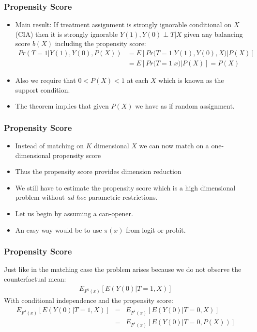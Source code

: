 \documentclass[xcolor=pdftex,dvipsnames,table,mathserif,aspectratio=169]{beamer}
\begin{document}
\begin{frame}
\frametitle{Propensity Score}
\begin{itemize}
\item Main result: If treatment assignment is strongly ignorable conditional on $X$ (CIA) then it is strongly ignorable $Y(1),Y(0) \perp T | X$ given any balancing score $b(X)$ including the propensity score:
\begin{align*}
Pr(T=1 | Y(1), Y(0),P(X))&= E[Pr(T=1| Y(1),Y(0),X) | P(X)] \\
&= E[Pr(T=1 | x) | P(X) ] = P(X)
\end{align*}
\item Also we require that $0 < P(X) < 1$ at each $X$ which is known as the \alert{support condition}.
\item The theorem implies that given $P(X)$ we have as if random assignment.
\end{itemize}
\end{frame}

\begin{frame}
\frametitle{Propensity Score}
\begin{itemize}
\item Instead of matching on $K$ dimensional $X$ we can now match on a one-dimensional propensity score
\item Thus the propensity score provides \alert{dimension reduction}
\item We still have to estimate the propensity score which is a high dimensional problem without \textit{ad-hoc} parametric restrictions.
\item Let us begin by assuming a can-opener.
\item An easy way would be to use $\pi(x)$ from logit or probit.
\end{itemize}
\end{frame}


\begin{frame}
\frametitle{Propensity Score}
Just like in the matching case the problem arises because we do not observe the counterfactual mean:
\begin{eqnarray*}
 E_{F^1(x)} [E(Y(0) | T=1,X)] 
\end{eqnarray*}
With conditional independence and the propensity score:
\begin{eqnarray*}
 E_{F^1(x)} [E(Y(0) | T=1,X)]  &=&  E_{F^1(x)} [E(Y(0) | T=0,X)] \\
 &=&  E_{F^1(x)} [E(Y(0) | T=0,P(X))] 
\end{eqnarray*}
\end{frame}
\end{document}

